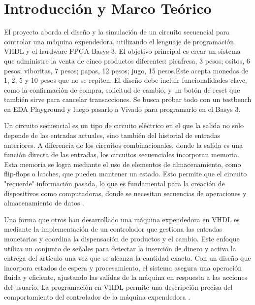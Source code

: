 \documentclass[12pt]{article}  %
\begin{document}
\section{Introducción y Marco Teórico}
El proyecto aborda el diseño y la simulación de un circuito secuencial para controlar una máquina expendedora, utilizando el lenguaje de programación VHDL y el hardware FPGA Basys 3. El objetivo principal es crear un sistema que administre la venta de cinco productos diferentes: picafresa, 3 pesos; ositos, 6 pesos; viboritas, 7 pesos; papas, 12 pesos; jugo, 15 pesos.Este acepta monedas de 1, 2, 5 y 10 pesos que no se repiten. El diseño debe incluir funcionalidades clave, como la confirmación de compra, solicitud de cambio, y un botón de reset que también sirve para cancelar transacciones. Se busca probar todo con un testbench en EDA Playground y luego pasarlo a Vivado para programarlo en el Basys 3.

Un circuito secuencial es un tipo de circuito eléctrico en el que la salida no solo depende de las entradas actuales, sino también del historial de entradas anteriores. A diferencia de los circuitos combinacionales, donde la salida es una función directa de las entradas, los circuitos secuenciales incorporan memoria. Esta memoria se logra mediante el uso de elementos de almacenamiento, como flip-flops o latches, que pueden mantener un estado. Esto permite que el circuito "recuerde" información pasada, lo que es fundamental para la creación de dispositivos como computadoras, donde se necesitan secuencias de operaciones y almacenamiento de datos \cite{7169287}.

Una forma que otros han desarrollado una máquina expendedora en VHDL es mediante la implementación de un controlador que gestiona las entradas monetarias y coordina la dispensación de productos y el cambio. Este enfoque utiliza un conjunto de señales para detectar la inserción de dinero y activa la entrega del artículo una vez que se alcanza la cantidad exacta. Con un diseño que incorpora estados de espera y procesamiento, el sistema asegura una operación fluida y eficiente, ajustando las salidas de la máquina en respuesta a las acciones del usuario. La programación en VHDL permite una descripción precisa del comportamiento del controlador de la máquina expendedora \cite{lameres2019quick}.
\end{document}
